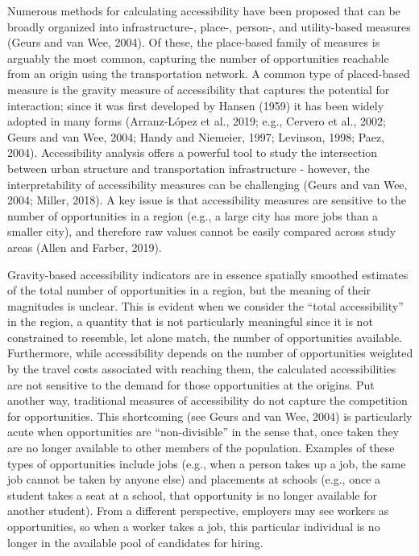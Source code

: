 \documentclass[]{elsarticle} %
\begin{document}
Numerous methods for calculating accessibility have been proposed that
can be broadly organized into infrastructure-, place-, person-, and
utility-based measures (Geurs and van Wee, 2004). Of these, the
place-based family of measures is arguably the most common, capturing
the number of opportunities reachable from an origin using the
transportation network. A common type of placed-based measure is the
gravity measure of accessibility that captures the potential for
interaction; since it was first developed by Hansen (1959) it has been
widely adopted in many forms (Arranz-López et al., 2019; e.g., Cervero
et al., 2002; Geurs and van Wee, 2004; Handy and Niemeier, 1997;
Levinson, 1998; Paez, 2004). Accessibility analysis offers a powerful
tool to study the intersection between urban structure and
transportation infrastructure - however, the interpretability of
accessibility measures can be challenging (Geurs and van Wee, 2004;
Miller, 2018). A key issue is that accessibility measures are sensitive
to the number of opportunities in a region (e.g., a large city has more
jobs than a smaller city), and therefore raw values cannot be easily
compared across study areas (Allen and Farber, 2019).

Gravity-based accessibility indicators are in essence spatially smoothed
estimates of the total number of opportunities in a region, but the
meaning of their magnitudes is unclear. This is evident when we consider
the ``total accessibility'' in the region, a quantity that is not
particularly meaningful since it is not constrained to resemble, let
alone match, the number of opportunities available. Furthermore, while
accessibility depends on the number of opportunities weighted by the
travel costs associated with reaching them, the calculated
accessibilities are not sensitive to the demand for those opportunities
at the origins. Put another way, traditional measures of accessibility
do not capture the competition for opportunities. This shortcoming (see
Geurs and van Wee, 2004) is particularly acute when opportunities are
``non-divisible'' in the sense that, once taken they are no longer
available to other members of the population. Examples of these types of
opportunities include jobs (e.g., when a person takes up a job, the same
job cannot be taken by anyone else) and placements at schools (e.g.,
once a student takes a seat at a school, that opportunity is no longer
available for another student). From a different perspective, employers
may see workers as opportunities, so when a worker takes a job, this
particular individual is no longer in the available pool of candidates
for hiring.
\end{document}
